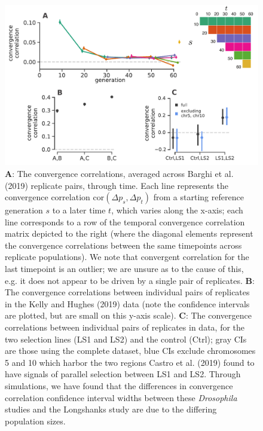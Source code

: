 \documentclass[9pt,twocolumn,twoside]{pnas-new}
\begin{document}
\begin{figure}
  \centering
  \includegraphics[width=15cm]{figure-2-pnas.pdf}

  \caption{{\bf A}: The convergence correlations, averaged across
    Barghi et al. (2019) replicate pairs, through time. Each line
    represents the convergence correlation $\mathrm{cor}(\Delta p_{s}, \Delta
    p_{t})$ from a starting reference generation $s$ to a later time $t$, which
    varies along the x-axis; each line corresponds to a row of the temporal
    convergence correlation matrix depicted to the right (where the
      diagonal elements represent the convergence correlations between the same
      timepoints across replicate populations). We note that convergent
      correlation for the last timepoint is an outlier; we are unsure as to the
      cause of this, e.g. it does not appear to be driven by a single pair of
      replicates. {\bf B}: The convergence correlations between individual
      pairs of replicates in the Kelly and Hughes (2019) data (note the
      confidence intervals are plotted, but are small on this y-axis scale).
      {\bf C}:  The convergence correlations between individual pairs of
      replicates in \cite{Castro2019-uk} data, for the two selection lines
      (LS1 and LS2) and the control (Ctrl); gray CIs are those using the
      complete dataset, blue CIs exclude chromosomes 5 and 10 which harbor the
      two regions Castro et al. (2019) found to have signals of parallel
      selection between LS1 and LS2. Through simulations, we have found
        that the differences in convergence correlation confidence interval
        widths between these \emph{Drosophila} studies and the Longshanks study
        are due to the differing population sizes.}

  \label{fig:figure-2}
\end{figure}
\end{document}
